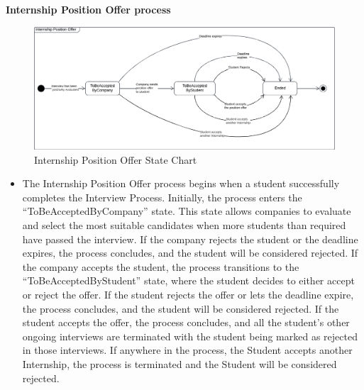 \noindent\textbf{Internship Position Offer process}\\
\begin{figure}[H]
    \centering
    \includegraphics[width=1 \textwidth]{Diagrams/StateCharts/InternshipPositionOfferStateChart.png}    
    \caption{Internship Position Offer State Chart}
    \label{fig:InternshipPositionOffer}
\end{figure}
\begin{itemize}
    \item The Internship Position Offer process begins when a student successfully completes the Interview Process. Initially, the process enters the “ToBeAcceptedByCompany” state.
    This state allows companies to evaluate and select the most suitable candidates when more students than required have passed the interview.
    If the company rejects the student or the deadline expires, the process concludes, and the student will be considered rejected.
    If the company accepts the student, the process transitions to the “ToBeAcceptedByStudent” state, where the student decides to either accept or reject the offer.
    If the student rejects the offer or lets the deadline expire, the process concludes, and the student will be considered rejected.
    If the student accepts the offer, the process concludes, and all the student’s other ongoing interviews are terminated with the student being marked as rejected in those interviews.
    If anywhere in the process, the Student accepts another Internship, the process is terminated and the Student will be considered rejected.
\end{itemize}

